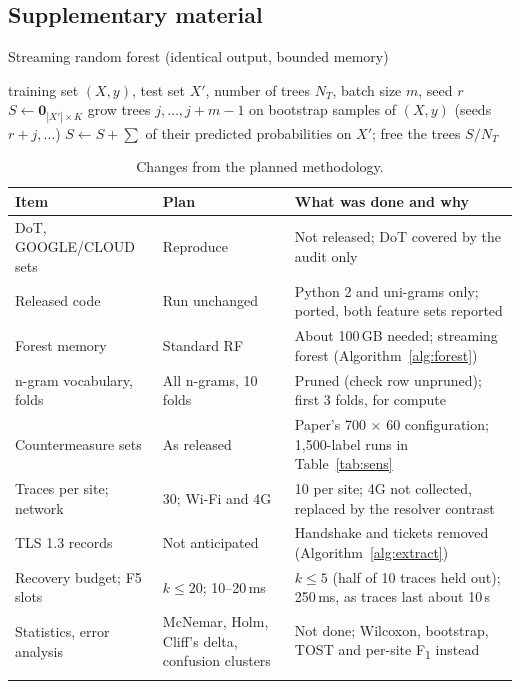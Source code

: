 \documentclass[pdflatex,sn-mathphys-num]{sn-jnl}
\newcommand{\Fone}{F\textsubscript{1}}
\begin{document}
\begin{appendices}

\section{Supplementary material}\label{app:extra}

\begin{algorithm}[h]
\caption{Streaming random forest (identical output, bounded memory)}\label{alg:forest}
\begin{algorithmic}[1]
\Require training set $(X,y)$, test set $X'$, number of trees $N_T$, batch size $m$, seed $r$
\State $S\gets\mathbf{0}_{|X'|\times K}$
  \State grow trees $j,\dots,j+m-1$ on bootstrap samples of $(X,y)$ (seeds $r+j,\dots$)
  \State $S\gets S+\sum$ of their predicted probabilities on $X'$; free the trees
\EndFor
\State \Return $S/N_T$
\end{algorithmic}
\end{algorithm}

\begin{table}[h]
\caption{Changes from the planned methodology.}\label{tab:deviations}
\scriptsize
\begin{tabular*}{\textwidth}{@{\extracolsep\fill}L{0.22\textwidth}L{0.22\textwidth}L{0.48\textwidth}@{}}
\toprule
Item & Plan & What was done and why \\
\midrule
DoT, GOOGLE/CLOUD sets & Reproduce & Not released; DoT covered by the audit only \\
Released code & Run unchanged & Python 2 and uni-grams only; ported, both feature sets reported \\
Forest memory & Standard RF & About 100\,GB needed; streaming forest (Algorithm~\ref{alg:forest}) \\
n-gram vocabulary, folds & All n-grams, 10 folds & Pruned (check row unpruned); first 3 folds, for compute \\
Countermeasure sets & As released & Paper's 700 $\times$ 60 configuration; 1,500-label runs in Table~\ref{tab:sens} \\
Traces per site; network & 30; Wi-Fi and 4G & 10 per site; 4G not collected, replaced by the resolver contrast \\
TLS 1.3 records & Not anticipated & Handshake and tickets removed (Algorithm~\ref{alg:extract}) \\
Recovery budget; F5 slots & $k\le20$; 10--20\,ms & $k\le5$ (half of 10 traces held out); 250\,ms, as traces last about 10\,s \\
Statistics, error analysis & McNemar, Holm, Cliff's delta, confusion clusters & Not done; Wilcoxon, bootstrap, TOST and per-site \Fone{} instead \\
\botrule
\end{tabular*}
\end{table}


\end{appendices}
\end{document}
